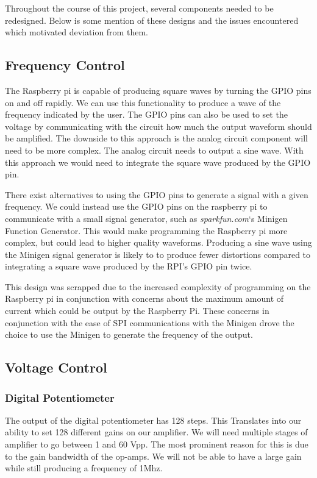 \documentclass{article}	%
\begin{document}
\begin{multicols}{2}
Throughout the course of this project,
several components needed to be redesigned.
Below is some mention of these designs and
the issues encountered which motivated deviation from them.

\subsection{Frequency Control}
The Raspberry pi is capable of producing square waves by turning the GPIO pins on and off rapidly. We can use this functionality to produce a wave of the frequency indicated by the user. The GPIO pins can also be used to set the voltage by communicating with the circuit how much the output waveform should be amplified. The downside to this approach is the analog circuit component will need to be more complex. The analog circuit needs to output a sine wave. With this approach we would need to integrate the square wave produced by the GPIO pin.

There exist alternatives to using the GPIO pins to generate a signal with a given frequency. We could instead use the GPIO pins on the raspberry pi to communicate with a small signal generator, such as \textit{sparkfun.com}‘s Minigen Function Generator. This would make programming the Raspberry pi more complex, but could lead to higher quality waveforms. Producing a sine wave using the Minigen signal generator is likely to to produce fewer distortions compared to integrating a square wave produced by the RPI’s GPIO pin twice. 

This design was scrapped due to the increased complexity of programming on
the Raspberry pi in conjunction with
concerns about the maximum amount of current which could be output
by the Raspberry Pi.
These concerns in conjunction with the ease of SPI communications
with the Minigen drove the choice to use the Minigen to generate the
frequency of the output.

\subsection{Voltage Control}
\subsubsection{Digital Potentiometer}
The output of the digital potentiometer has 128 steps. This Translates into our ability to set 128 different gains on our amplifier. We will need multiple stages of amplifier to go between 1 and 60 Vpp. The most prominent reason for this is due to the gain bandwidth of the op-amps. We will not be able to have a large gain while still producing a frequency of 1Mhz.


\end{multicols}
\end{document}
